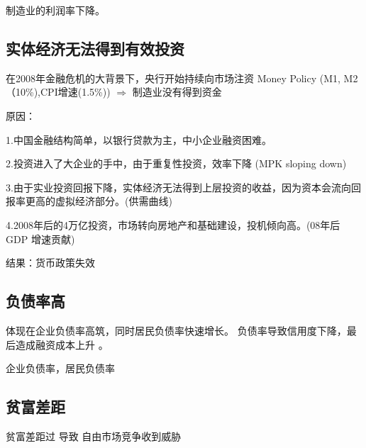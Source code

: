 \documentclass[10pt, a4paper]{article}
\begin{document}
        制造业的利润率下降。

    \subsection{实体经济无法得到有效投资}
        在2008年金融危机的大背景下，央行开始持续向市场注资 Money Policy (M1, M2（10\%),CPI增速(1.5\%)) $\Rightarrow$  制造业没有得到资金

        原因： 

        1.中国金融结构简单，以银行贷款为主，中小企业融资困难。

        2.投资进入了大企业的手中，由于重复性投资，效率下降 (MPK sloping down) 
        
        3.由于实业投资回报下降，实体经济无法得到上层投资的收益，因为资本会流向回报率更高的虚拟经济部分。(供需曲线) 
        
        4.2008年后的4万亿投资，市场转向房地产和基础建设，投机倾向高。(08年后 GDP 增速贡献)
        
        结果：货币政策失效 

    \subsection{负债率高}
        体现在企业负债率高筑，同时居民负债率快速增长。 负债率导致信用度下降，最后造成融资成本上升 。

        企业负债率，居民负债率
        
    \subsection{贫富差距}
        贫富差距过 导致 自由市场竞争收到威胁 
\end{document}
